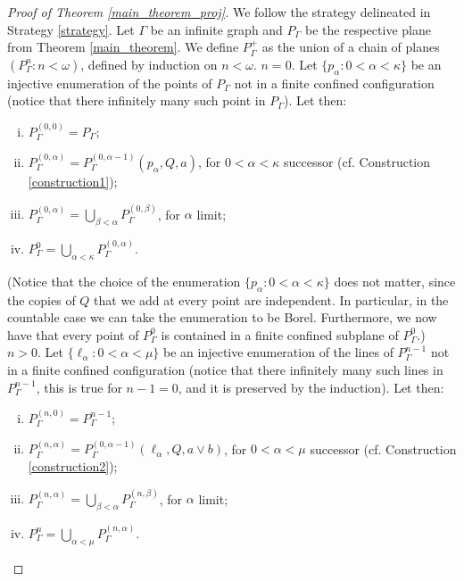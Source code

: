 \documentclass{amsart}
\numberwithin{claimcounter}{theorem}
\begin{document}
\begin{proof}[Proof of Theorem \ref{main_theorem_proj}] We follow the strategy delineated in Strategy \ref{strategy}. Let $\Gamma$ be an infinite graph and $P_{\Gamma}$ be the respective plane from Theorem \ref{main_theorem}. We define $P^+_{\Gamma}$ as the union of a chain of planes $(P^n_{\Gamma}: n < \omega)$, defined by induction on $n < \omega$. 
\newline \underline{$n = 0$}. Let $\{ p_{\alpha} : 0 < \alpha < \kappa \}$ be an injective enumeration of the points of $P_{\Gamma}$ not in a finite confined configuration (notice that there infinitely many such point in $P_{\Gamma}$). Let then:
\begin{enumerate}[(i)]
	\item $P^{(0, 0)}_{\Gamma} = P_{\Gamma}$;
	\item $P^{(0, \alpha)}_{\Gamma} = P^{(0, \alpha-1)}_{\Gamma}(p_{\alpha}, Q, a)$, for $0 <\alpha < \kappa$ successor (cf. Construction \ref{construction1});
	\item $P^{(0, \alpha)}_{\Gamma} = \bigcup_{\beta < \alpha} P^{(0, \beta)}_{\Gamma}$, for $\alpha$ limit;
	\item $P^0_{\Gamma} = \bigcup_{\alpha < \kappa} P^{(0, \alpha)}_{\Gamma}$.
\end{enumerate}
(Notice that the choice of the enumeration $\{ p_{\alpha} : 0 < \alpha < \kappa \}$ does not matter, since the copies of $Q$ that we add at every point are independent. In particular, in the countable case we can take the enumeration to be Borel. Furthermore, we now have that every point of $P^0_{\Gamma}$ is contained in a finite confined subplane of $P^0_{\Gamma}$.)
\newline \underline{$n > 0$}. Let $\{ \ell_{\alpha} : 0 < \alpha < \mu \}$ be an injective enumeration of the lines of $P^{n-1}_{\Gamma}$ not in a finite confined configuration (notice that there infinitely many such lines in $P^{n-1}_{\Gamma}$, this is true for $n - 1 = 0$, and it is preserved by the induction). Let then:
\begin{enumerate}[(i)]
	\item $P^{(n, 0)}_{\Gamma} = P^{n-1}_{\Gamma}$;
	\item $P^{(n, \alpha)}_{\Gamma} = P^{(0, \alpha-1)}_{\Gamma}(\ell_{\alpha}, Q, a \vee b)$, for $0 <\alpha < \mu$ successor (cf. Construction \ref{construction2});
	\item $P^{(n, \alpha)}_{\Gamma} = \bigcup_{\beta < \alpha} P^{(n, \beta)}_{\Gamma}$, for $\alpha$ limit;
	\item $P^n_{\Gamma} = \bigcup_{\alpha < \mu} P^{(n, \alpha)}_{\Gamma}$.

\end{enumerate}
\end{proof}
\end{document}
